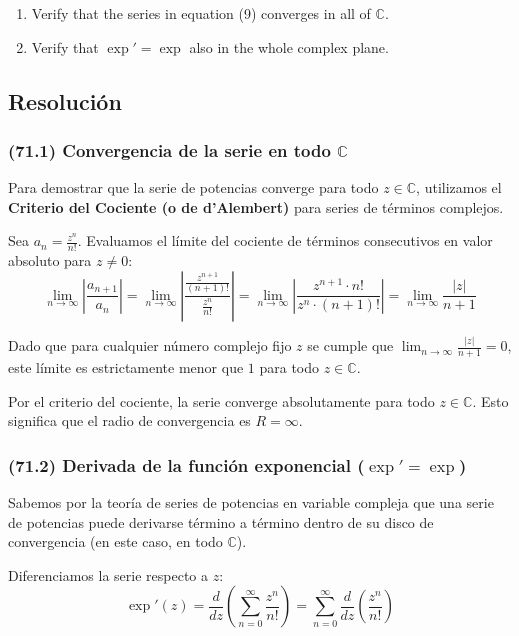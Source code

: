\documentclass[11pt,a4paper]{article}
\theoremstyle{definition}
\theoremstyle{plain}
\theoremstyle{remark}
\begin{document}
	\begin{enumerate}
		\item[(71.1)] Verify that the series in equation (9) converges in all of $\mathbb{C}$.
		\item[(71.2)] Verify that $\exp' = \exp$ also in the whole complex plane.
	\end{enumerate}
	
	\subsection*{Resolución}
	
	\subsubsection*{(71.1) Convergencia de la serie en todo $\mathbb{C}$}
	Para demostrar que la serie de potencias converge para todo $z \in \mathbb{C}$, utilizamos el \textbf{Criterio del Cociente (o de d'Alembert)} para series de términos complejos. 
	
	Sea $a_n = \frac{z^n}{n!}$. Evaluamos el límite del cociente de términos consecutivos en valor absoluto para $z \neq 0$:
	\[
	\lim_{n \to \infty} \left| \frac{a_{n+1}}{a_n} \right| = \lim_{n \to \infty} \left| \frac{\frac{z^{n+1}}{(n+1)!}}{\frac{z^n}{n!}} \right| = \lim_{n \to \infty} \left| \frac{z^{n+1} \cdot n!}{z^n \cdot (n+1)!} \right| = \lim_{n \to \infty} \frac{|z|}{n+1}
	\]
	
	Dado que para cualquier número complejo fijo $z$ se cumple que $\lim_{n \to \infty} \frac{|z|}{n+1} = 0$, este límite es estrictamente menor que $1$ para todo $z \in \mathbb{C}$. 
	
	Por el criterio del cociente, la serie converge absolutamente para todo $z \in \mathbb{C}$. Esto significa que el radio de convergencia es $R = \infty$.
	
	\subsubsection*{(71.2) Derivada de la función exponencial ($\exp' = \exp$)}
	Sabemos por la teoría de series de potencias en variable compleja que una serie de potencias puede derivarse término a término dentro de su disco de convergencia (en este caso, en todo $\mathbb{C}$). 
	
	Diferenciamos la serie respecto a $z$:
	\[
	\exp'(z) = \frac{d}{dz} \left( \sum_{n=0}^\infty \frac{z^n}{n!} \right) = \sum_{n=0}^\infty \frac{d}{dz} \left( \frac{z^n}{n!} \right)
	\]
	
\end{document}
